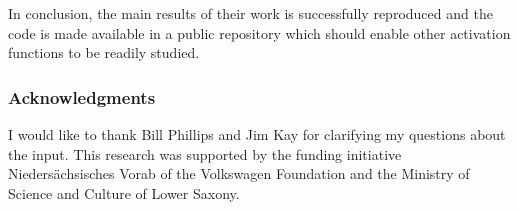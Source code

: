 In conclusion, the main results of their work is successfully reproduced and the code is made available in a public repository which should enable other activation functions to be readily studied.

\subsubsection{Acknowledgments}

I would like to thank Bill Phillips and Jim Kay for clarifying my questions about the input. This research was supported by the funding initiative Niedersächsisches Vorab of the Volkswagen Foundation and the Ministry of Science and Culture of Lower Saxony.
